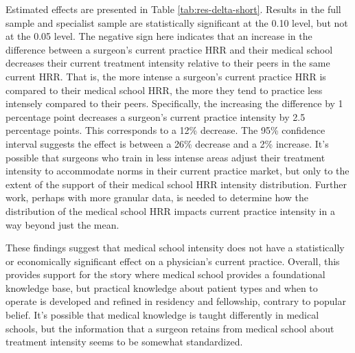 Estimated effects are presented in Table \ref{tab:res-delta-short}. Results in the full sample and specialist sample are statistically significant at the 0.10 level, but not at the 0.05 level. The negative sign here indicates that an increase in the difference between a surgeon's current practice HRR and their medical school decreases their current treatment intensity relative to their peers in the same current HRR. That is, the more intense a surgeon's current practice HRR is compared to their medical school HRR, the more they tend to practice less intensely compared to their peers. Specifically, the increasing the difference by 1 percentage point decreases a surgeon's current practice intensity by 2.5 percentage points. This corresponds to a 12\% decrease. The 95\% confidence interval suggests the effect is between a 26\% decrease and a 2\% increase. It's possible that surgeons who train in less intense areas adjust their treatment intensity to accommodate norms in their current practice market, but only to the extent of the support of their medical school HRR intensity distribution. Further work, perhaps with more granular data, is needed to determine how the distribution of the medical school HRR impacts current practice intensity in a way beyond just the mean. 



These findings suggest that medical school intensity does not have a statistically or economically significant effect on a physician's current practice. Overall, this provides support for the story where medical school provides a foundational knowledge base, but practical knowledge about patient types and when to operate is developed and refined in residency and fellowship, contrary to popular belief. It's possible that medical knowledge is taught differently in medical schools, but the information that a surgeon retains from medical school about treatment intensity seems to be somewhat standardized. 
